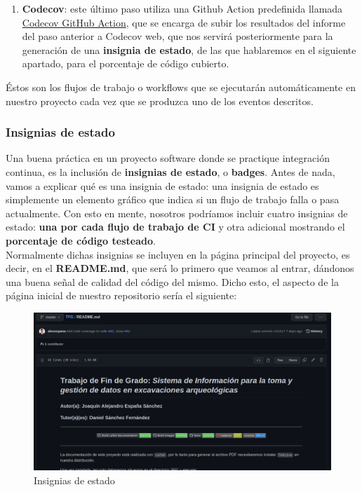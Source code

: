 \begin{enumerate}
\begin{enumerate}
\begin{enumerate}
                        \item \textbf{Codecov}: este último paso utiliza una Github Action
                        predefinida llamada
                        \href{https://github.com/marketplace/actions/codecov}{Codecov GitHub
                        Action}, que se encarga de subir los resultados del informe del paso
                        anterior a Codecov web, que nos servirá posteriormente para la
                        generación de una \textbf{insignia de estado}, de las que hablaremos
                        en el siguiente apartado, para el porcentaje de código cubierto.
                    \end{enumerate}
            \end{enumerate}
    \end{enumerate}

Éstos son los flujos de trabajo o workflows que se ejecutarán automáticamente en nuestro
proyecto cada vez que se produzca uno de los eventos descritos.

\subsubsection{Insignias de estado}
Una buena práctica en un proyecto software donde se practique integración continua, es la
inclusión de \textbf{insignias de estado}, o \textbf{badges}. Antes de nada, vamos a
explicar qué es una insignia de estado: una insignia de estado es simplemente un elemento
gráfico que indica si un flujo de trabajo falla o pasa actualmente. Con esto en mente,
nosotros podríamos incluir cuatro insignias de estado: \textbf{una por cada flujo de
trabajo de CI} y otra adicional mostrando el \textbf{porcentaje de código testeado}.\\

Normalmente dichas insignias se incluyen en la página principal del proyecto, es decir, en
el \textbf{README.md}, que será lo primero que veamos al entrar, dándonos una buena señal
de calidad del código del mismo. Dicho esto, el aspecto de la página inicial de nuestro
repositorio sería el siguiente:

    \begin{figure}[H]
        \centering
        \includegraphics[scale=0.27]{imagenes/badge-status.png}
        \caption{Insignias de estado}
        \label{fig:badge-status}
    \end{figure}

